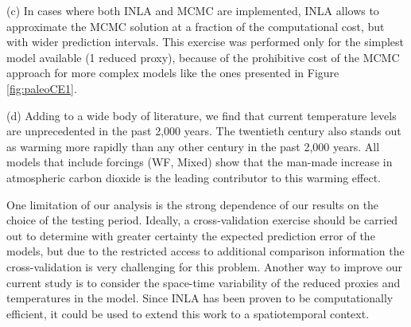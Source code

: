 \documentclass[12pt]{amsart}
\theoremstyle{plain}
\theoremstyle{definition}
\theoremstyle{remark}
\begin{document}
     \noindent (c) In cases where both INLA and MCMC are implemented, INLA allows to approximate the MCMC
      solution at a fraction of the computational cost, but with wider
      prediction intervals. This exercise was performed only for the simplest
      model available (1 reduced proxy), because of the prohibitive cost of the
      MCMC approach for more complex models like the ones presented in Figure
      \ref{fig:paleoCE1}. 
      
     \noindent (d) Adding to a wide body of literature, we find that current temperature levels are unprecedented in the past 2,000 years. 
      The twentieth century also stands out as warming more rapidly than any other
      century in the past 2,000 years. All models that include forcings (WF, Mixed) show that the man-made increase in atmospheric carbon dioxide is the leading contributor to this warming effect. 

One limitation of our analysis is the strong
dependence of our results on the choice of the testing period. Ideally, a
cross-validation exercise should be carried out to determine with greater
certainty the expected prediction error of the models, but due to the restricted access to
additional comparison information the cross-validation is very challenging for this problem. 
Another way to improve our current study is to consider the space-time variability of the reduced proxies and temperatures in the model. 
Since INLA has been proven to be computationally
efficient, it could be used to extend this work to a spatiotemporal context.



\end{document}
